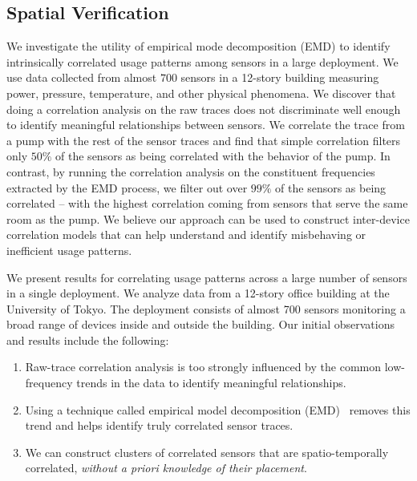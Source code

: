 \subsection{Spatial Verification}

We investigate the utility of empirical mode decomposition (EMD) to identify intrinsically
correlated usage patterns among sensors in a large deployment.  We use data collected from almost $700$
sensors in a 12-story building measuring power, pressure, temperature, and other physical
phenomena.  We discover that doing a correlation analysis on the raw traces does not discriminate well enough
to identify meaningful relationships between sensors.  We correlate the trace from a pump with the rest of
the sensor traces and find that simple correlation filters only $50\%$ of the sensors as being correlated
with the behavior of the pump. 
In contrast, by running the correlation analysis on the constituent frequencies extracted by
the EMD process, we filter out over $99\%$ of the sensors as being correlated -- with the highest correlation coming 
from sensors that serve the same room as the pump.  We believe our approach can be used to 
construct inter-device correlation models that can help understand and identify misbehaving or inefficient
usage patterns.

We present results for correlating usage patterns across a large number of sensors
in a single deployment.  We analyze data from a 12-story office building at the University of Tokyo.  
The deployment consists of almost 700 sensors monitoring a broad range of devices inside and outside 
the building.  Our initial observations and results include the following:

\begin{enumerate}
\item Raw-trace correlation analysis is too strongly influenced by the common low-frequency trends in the data
	to identify meaningful relationships.
\item Using a technique called empirical model decomposition (EMD)~\cite{huang:emd1998} removes this 
		 trend and helps identify truly correlated sensor traces.
\item We can construct clusters of correlated sensors that are spatio-temporally correlated, \emph{without
		a priori knowledge of their placement}.
\end{enumerate}


